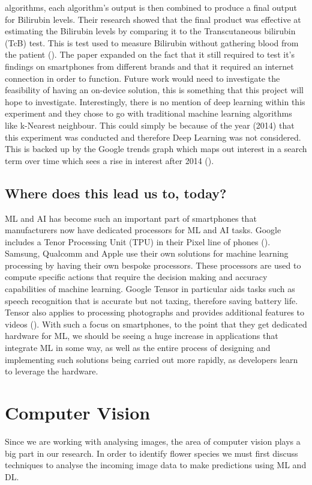 \documentclass{article}
\begin{document}
algorithms, each algorithm’s output is then combined to produce a final output for Bilirubin levels. Their research 
showed that the final product was effective at estimating the Bilirubin levels by comparing it to the Transcutaneous 
bilirubin (TcB) test. This is test used to measure Bilirubin without gathering blood from the patient 
(\cite{tufts2021}). The paper expanded on the fact that it still required to test it’s findings on smartphones 
from different brands and that it required an internet connection in order to function. Future work would need to 
investigate the feasibility of having an on-device solution, this is something that this project will hope to 
investigate. Interestingly, there is no mention of deep learning within this experiment and they chose to go with 
traditional machine learning algorithms like k-Nearest neighbour. This could simply be because of the year (2014) 
that this experiment was conducted and therefore Deep Learning was not considered. This is backed up by the Google 
trends graph which maps out interest in a search term over time which sees a rise in interest after 2014 (\cite{googletrends}).
\subsection{Where does this lead us to, today?} 
ML and AI has become such an important part of smartphones that manufacturers now have dedicated processors for ML and 
AI tasks. Google includes a Tenor Processing Unit (TPU) in their Pixel line of phones (\cite{triggs2021}). Samsung, 
Qualcomm and Apple use their own solutions for machine learning processing by having their own bespoke processors. These
 processors are used to compute specific actions that require the decision making and accuracy capabilities of machine 
 learning. Google Tensor in particular aids tasks such as speech recognition that is accurate but not taxing, therefore 
 saving battery life. Tensor also applies to processing photographs and provides additional features to videos 
 (\cite{gupta2021}). With such a focus on smartphones, to the point that they get dedicated hardware for ML, we should be 
 seeing a huge increase in applications that integrate ML in some way, as well as the entire process of designing and 
 implementing such solutions being carried out more rapidly, as developers learn to leverage the hardware.
\section{Computer Vision}
Since we are working with analysing images, the area of computer vision plays a big part in our research. In order to 
identify flower species we must first discuss techniques to analyse the incoming image data to make predictions using
 ML and DL.
\end{document}
